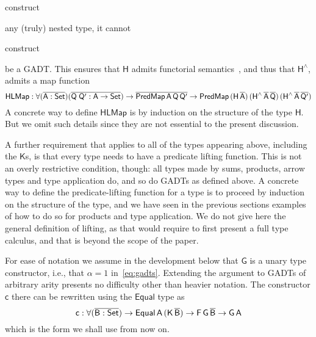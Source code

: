 \documentclass[9pt]{entcs}
\begin{document}
construct


any (truly)
nested type, it cannot

construct

be a GADT.  This ensures that $\mathsf{H}$
admits functorial semantics~\cite{jp20}, and thus that
$\mathsf{H^{\wedge}}$, admits a map function
\[\mathsf{HLMap : \forall (\overline{A : Set}) (\overline{Q\;Q' : A \to Set}) 
\to \overline{PredMap\,A\,Q\,Q'} \to
PredMap\,(H\,\overline{A})\,(H^{\wedge}\,\overline{A}\,\overline{Q})\,
(H^{\wedge}\,\overline{A}\,\overline{Q'})}\] A concrete way to define
$\mathsf{HLMap}$ is by induction on the structure of the type
$\mathsf{H}$.
But we omit such details since they are not essential to the present
discussion.



A further requirement that applies to all of the types appearing
above, including the $\mathsf{K}$s, is that every type needs to have a
predicate lifting function.  This is not an overly restrictive
condition, though: all types made by sums, products, arrow types and
type application do, and so do GADTs as defined above. A concrete way
to define the predicate-lifting function for a type is to proceed by
induction on the structure of the type, and we have seen in the
previous sections examples of how to do so for products and type
application.  We do not give here the general definition of lifting,
as that would require to first present a full type calculus, and that
is beyond the scope of the paper.



For ease of notation we assume in the development below that
$\mathsf{G}$ is a unary type constructor, i.e., that $\alpha = 1$
in~\eqref{eq:gadts}. Extending the argument to GADTs of arbitrary
arity presents no difficulty other than heavier notation. The
constructor $\mathsf{c}$ there can be rewritten using the
$\mathsf{Equal}$ type as
\[\mathsf{c : \forall (\overline{B : Set}) \to Equal\,A\,(K\,\overline{B}) \to
  F\,G\,\overline{B} \to G\,A}\]
which is the form we shall use from now on.
\end{document}
